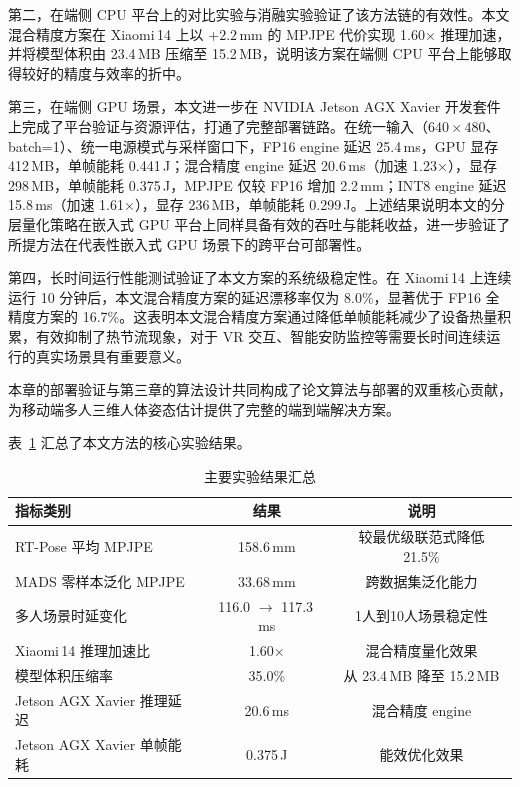第二，在端侧 CPU 平台上的对比实验与消融实验验证了该方法链的有效性。本文混合精度方案在 Xiaomi\,14 上以 $+2.2\,\text{mm}$ 的 MPJPE 代价实现 1.60$\times$ 推理加速，并将模型体积由 23.4\,MB 压缩至 15.2\,MB，说明该方案在端侧 CPU 平台上能够取得较好的精度与效率的折中。

第三，在端侧 GPU 场景，本文进一步在 NVIDIA Jetson AGX Xavier 开发套件上完成了平台验证与资源评估，打通了完整部署链路。在统一输入（$640\times480$、batch=1）、统一电源模式与采样窗口下，FP16 engine 延迟 25.4\,ms，GPU 显存 412\,MB，单帧能耗 0.441\,J；混合精度 engine 延迟 20.6\,ms（加速 1.23$\times$），显存 298\,MB，单帧能耗 0.375\,J，MPJPE 仅较 FP16 增加 2.2\,mm；INT8 engine 延迟 15.8\,ms（加速 1.61$\times$），显存 236\,MB，单帧能耗 0.299\,J。上述结果说明本文的分层量化策略在嵌入式 GPU 平台上同样具备有效的吞吐与能耗收益，进一步验证了所提方法在代表性嵌入式 GPU 场景下的跨平台可部署性。

第四，长时间运行性能测试验证了本文方案的系统级稳定性。在 Xiaomi\,14 上连续运行 10 分钟后，本文混合精度方案的延迟漂移率仅为 8.0\%，显著优于 FP16 全精度方案的 16.7\%。这表明本文混合精度方案通过降低单帧能耗减少了设备热量积累，有效抑制了热节流现象，对于 VR 交互、智能安防监控等需要长时间连续运行的真实场景具有重要意义。

本章的部署验证与第三章的算法设计共同构成了论文算法与部署的双重核心贡献，为移动端多人三维人体姿态估计提供了完整的端到端解决方案。

表~\ref{tab:main_results_summary} 汇总了本文方法的核心实验结果。

\begin{table}[htbp]
  \centering
  \small
  \caption{主要实验结果汇总}
  \label{tab:main_results_summary}
  \begin{tabular}{@{}lcc@{}}
    \toprule
    指标类别 & 结果 & 说明 \\
    \midrule
    RT-Pose 平均 MPJPE & 158.6\,mm & 较最优级联范式降低 21.5\% \\
    MADS 零样本泛化 MPJPE & 33.68\,mm & 跨数据集泛化能力 \\
    多人场景时延变化 & 116.0 $\to$ 117.3\,ms & 1人到10人场景稳定性 \\
    Xiaomi\,14 推理加速比 & 1.60$\times$ & 混合精度量化效果 \\
    模型体积压缩率 & 35.0\% & 从 23.4\,MB 降至 15.2\,MB \\
    Jetson AGX Xavier 推理延迟 & 20.6\,ms & 混合精度 engine \\
    Jetson AGX Xavier 单帧能耗 & 0.375\,J & 能效优化效果 \\
    \bottomrule
  \end{tabular}
\end{table}

